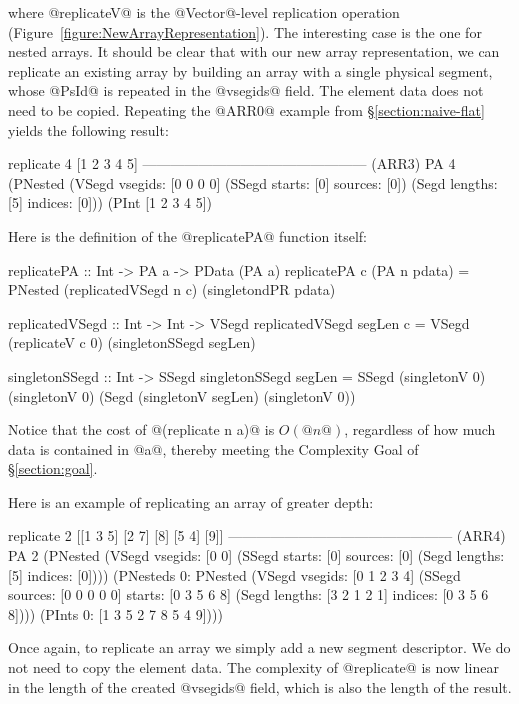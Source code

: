 \par
\noindent
where @replicateV@ is the @Vector@-level replication operation 
(Figure~\ref{figure:NewArrayRepresentation}).
The interesting case is the one for nested arrays.  It should be clear that with our new array representation, we can replicate an existing array by building an array with a single physical segment, whose @PsId@ is repeated in the @vsegids@ field. The element data does not need to be copied.  Repeating the @ARR0@ example from \S\ref{section:naive-flat} yields the following result: \par
\begin{small}
\begin{code}
  replicate 4 [1 2 3 4 5]
 ------------------------------------------------ (ARR3)
  PA 4 (PNested
   (VSegd vsegids: [0 0 0 0]
   (SSegd  starts: [0] sources: [0])
   (Segd  lengths: [5] indices: [0]))
   (PInt [1 2 3 4 5])
\end{code}
\end{small}
\par
\noindent
Here is the definition of the @replicatePA@ function itself:
\par
\begin{small}
\begin{code}
 replicatePA :: Int -> PA a -> PData (PA a)
 replicatePA c (PA n pdata)
  = PNested (replicatedVSegd n c) 
            (singletondPR pdata)

 replicatedVSegd :: Int -> Int -> VSegd
 replicatedVSegd segLen c 
  = VSegd (replicateV c 0) (singletonSSegd segLen)

 singletonSSegd :: Int -> SSegd
 singletonSSegd segLen
  = SSegd (singletonV 0) (singletonV 0)
          (Segd (singletonV segLen) (singletonV 0))
\end{code}
\end{small}
\par
\noindent
Notice that the cost of @(replicate n a)@ is $O(@n@)$, regardless of how much data is contained in @a@, thereby meeting the Complexity Goal
of \S\ref{section:goal}.

Here is an example of replicating an array of greater depth: 
\par
\begin{small}
\begin{code}
  replicate 2 [[1 3 5] [2 7] [8] [5 4] [9]]
 ------------------------------------------------ (ARR4)
  PA 2 (PNested
   (VSegd vsegids: [0 0] 
   (SSegd  starts: [0] sources: [0]
   (Segd  lengths: [5] indices: [0])))
   (PNesteds 
    0: PNested 
         (VSegd vsegids: [0 1 2 3 4]
         (SSegd sources: [0 0 0 0 0]  starts: [0 3 5 6 8]
         (Segd  lengths: [3 2 1 2 1] indices: [0 3 5 6 8])))
         (PInts 0: [1 3 5 2 7 8 5 4 9])))
\end{code}
\end{small}
\par
Once again, to replicate an array we simply add a new segment descriptor. We do not need to copy the element data. The complexity of @replicate@ is now linear in the length of the created @vsegids@ field, which is also the length of the result. 


